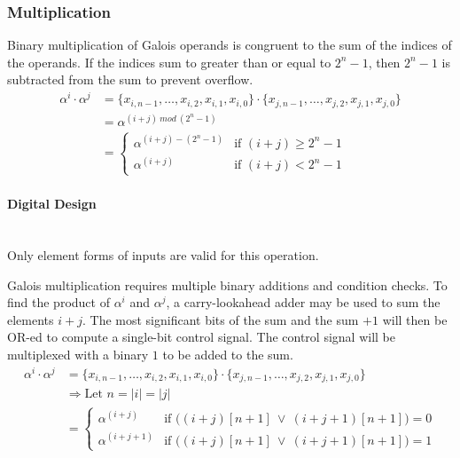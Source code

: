 \subsubsection{Multiplication} Binary multiplication of Galois operands is
congruent to the sum of the indices of the operands. If the indices sum to
greater than or equal to $2^{n}-1$, then $2^{n}-1$ is subtracted from the sum
to prevent overflow.
\begin{align*}
    \alpha^{i} \cdot \alpha^{j} & = \{ x_{i, n-1}, \ldots, x_{i, 2}, x_{i, 1},
    x_{i, 0} \} \cdot \{x_{j, n-1}, \ldots, x_{j, 2}, x_{j, 1}, x_{j, 0}\} \\
    & = \alpha^{(i + j) \ mod \ (2^{n}-1)} \\
    & = \begin{cases}
            \alpha^{(i + j) - (2^{n}-1)} & \text{if $(i + j) \geq 2^{n}-1$} \\
            \alpha^{(i + j)} & \text{if $(i + j) < 2^{n}-1$}
        \end{cases}
\end{align*}

    \paragraph{{\small Digital Design}} \leavevmode \\ Only element forms of
    inputs are valid for this operation.

    Galois multiplication requires multiple binary additions and condition
    checks. To find the product of $\alpha^{i}$ and $\alpha^{j}$,
    a carry-lookahead adder may be used to sum the elements $i+j$. The most
    significant bits of the sum and the sum $+1$ will then be OR-ed to compute
    a single-bit control signal. The control signal will be multiplexed with a
    binary $1$ to be added to the sum.
\begin{align*}
    \alpha^{i} \cdot \alpha^{j} & = \{ x_{i, n-1}, \ldots, x_{i, 2}, x_{i, 1},
    x_{i, 0} \} \cdot \{x_{j, n-1}, \ldots, x_{j, 2}, x_{j, 1}, x_{j, 0}\} \\
    & \Longrightarrow \text{Let } n = |i| = |j| \\
    & = \begin{cases}
            \alpha^{(i + j)} & \text{if $\Big((i+j)[n+1] \ \vee \
            (i+j+1)[n+1]\Big)=0$} \\
            \alpha^{(i + j + 1)} & \text{if $\Big((i+j)[n+1] \ \vee \
            (i+j+1)[n+1]\Big)=1$}
        \end{cases}
\end{align*}
